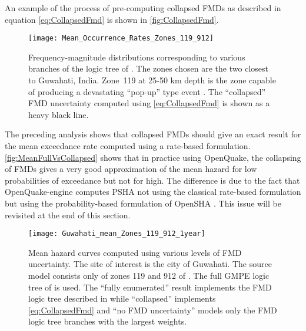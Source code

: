 \documentclass{article}
\begin{document}
An example of the process of pre-computing collapsed FMDs as described in equation \eqref{eq:CollapsedFmd} is shown in \autoref{fig:CollapsedFmd}.

\begin{figure}
\begin{adjustbox}{center}
\texttt{[image: Mean\_Occurrence\_Rates\_Zones\_119\_912]}
\end{adjustbox}
\caption[Frequency-magnitude distributions for two zones nearest to Guwahati, India]{Frequency-magnitude distributions corresponding to various branches of the logic tree of \cite{nath2012probabilistic}. 
The zones chosen are the two closest to Guwahati, India. 
Zone~119 at 25-50 km depth is the zone capable of producing a devastating ``pop-up'' type event \citep{Bilham2001, nath2012ground}. 
The ``collapsed'' FMD uncertainty computed using \eqref{eq:CollapsedFmd} is shown as a heavy black line.} 
\label{fig:CollapsedFmd}
\end{figure}

The preceding analysis shows that collapsed FMDs should give an exact result for the mean exceedance rate computed using a rate-based formulation. 
\autoref{fig:MeanFullVsCollapsed} shows that in practice using OpenQuake, the collapsing of FMDs gives a very good approximation of the mean hazard for low probabilities of exceedance but not for high. 
The difference is due to the fact that OpenQuake-engine computes PSHA not using the classical rate-based formulation but using the probability-based formulation of OpenSHA \citep{field2003opensha,pagani2014openquake}.
This issue will be revisited at the end of this section.

\begin{figure}
\begin{adjustbox}{center}
\texttt{[image: Guwahati\_mean\_Zones\_119\_912\_1year]}
\end{adjustbox}
\caption[Mean hazard curves computed using various levels of FMD uncertainty]{Mean hazard curves computed using various levels of FMD uncertainty. 
The site of interest is the city of Guwahati. 
The source model consists only of zones 119 and 912 of \cite{nath2012probabilistic}. 
The full GMPE logic tree of \cite{nath2012probabilistic} is used. 
The ``fully enumerated'' result implements the FMD logic tree described in \cite{nath2012probabilistic} while ``collapsed'' implements \eqref{eq:CollapsedFmd} and ``no FMD uncertainty'' models only the FMD logic tree branches with the largest weights.} 
\label{fig:MeanFullVsCollapsed}
\end{figure}
\end{document}
